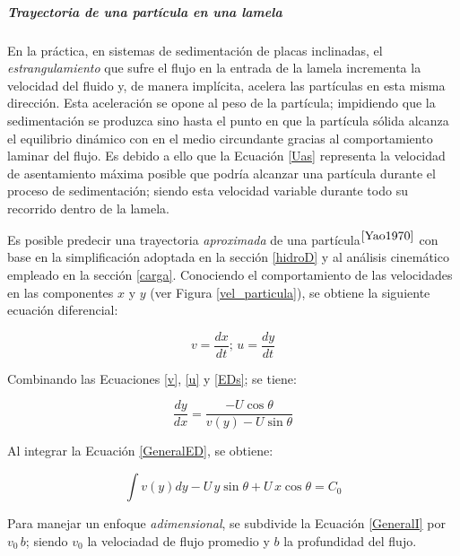 \subparagraph{Trayectoria de una part\'icula en una lamela}

\noindent
\justify

En la pr\'actica, en sistemas de sedimentaci\'on de placas inclinadas, el \textit{estrangulamiento} que sufre el flujo en la entrada de la lamela incrementa la velocidad del fluido y, de manera impl\'icita, acelera las part\'iculas en esta misma direcci\'on. Esta aceleraci\'on se opone al peso de la part\'icula; impidiendo que la sedimentaci\'on se produzca sino hasta el punto en que la part\'icula s\'olida alcanza el equilibrio din\'amico con en el medio circundante gracias al comportamiento laminar del flujo. Es debido a ello que la Ecuaci\'on \ref{Uas} representa la velocidad de asentamiento m\'axima posible que podr\'ia alcanzar una part\'icula durante el proceso de sedimentaci\'on; siendo esta velocidad variable durante todo su recorrido dentro de la lamela.

\noindent
\justify

Es posible predecir una trayectoria \textit{aproximada} de una part\'icula$^{\cite{Yao1970}}$ con base en la simplificaci\'on adoptada en la secci\'on \ref{hidroD} y al an\'alisis cinem\'atico empleado en la secci\'on \ref{carga}. Conociendo el comportamiento de las velocidades en las componentes $x$ y $y$ (ver Figura \ref{vel_particula}), se obtiene la siguiente ecuaci\'on diferencial:

\begin{equation}
	v = \frac{dx}{dt}; \, u = \frac{dy}{dt}
	\label{EDs}
\end{equation}

\noindent
\justify

Combinando las Ecuaciones \ref{v}, \ref{u} y \ref{EDs}; se tiene:

\begin{equation}
	\frac{dy}{dx} = \frac{-U \cos \theta}{v(y)-U \sin \theta}
	\label{GeneralED}
\end{equation}

\noindent
\justify

Al integrar la Ecuaci\'on \ref{GeneralED}, se obtiene:

\begin{equation}
	\int v(y) dy - U \, y \sin \theta + U \, x \cos \theta = C_0
	\label{GeneralI}
\end{equation}

\noindent
\justify

Para manejar un enfoque \textit{adimensional}, se subdivide la Ecuaci\'on \ref{GeneralI} por $v_0 \, b$; siendo $v_0$ la velociadad de flujo promedio y $b$ la profundidad del flujo.


